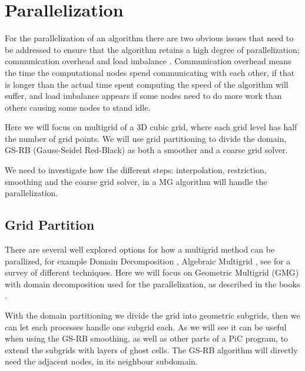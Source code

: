 \section{Parallelization}
	For the parallelization of an algorithm there are two obvious issues that need
	to be addressed to ensure that the algorithm retains a high degree of parallelization;
	communication overhead and load imbalance \citep{hackbusch_multigrid_1982}.
	Communication overhead means the time the computational nodes spend communicating
	with each other, if that is longer than the actual time spent computing the speed
	of the algorithm will suffer, and load imbalance appears if some nodes need to
	do more work than others causing some nodes to stand idle.

	Here we will focus on multigrid of a 3D cubic grid, where each grid level has
	half the number of grid points. We will use grid
	partitioning to divide the domain, GS-RB (Gauss-Seidel Red-Black) as both a
	smoother and a coarse grid solver.

	We need to investigate how the different steps: interpolation, restriction,
	smoothing and the coarse grid solver, in a MG algorithm will handle the parallelization.

	\subsection{Grid Partition}
		\label{sec:grid_partitioning}
		There are several well explored options for how a multigrid method can be
		parallized, for example Domain Decomposition \citep{arraras_domain_2015},
		Algebraic Multigrid \citep{stuben_review_2001}, see \citet{chow_survey_2006}
		for a survey of different techniques. Here we will focus on Geometric
		Multigrid (GMG) with domain decomposition used for the parallelization, as
		described in the books \citet{trottenberg_multigrid_2000,hackbusch_multigrid_1982}.

		With the domain partitioning we divide the grid into geometric
		subgrids, then we can let each processes handle one subgrid each. As we will
		see it can be useful when using the GS-RB smoothing, as well as other parts
	    of a PiC program, to extend the subgrids with layers of ghost cells. The GS-RB
	    algorithm will directly need the adjacent nodes, in its neighbour subdomain.

